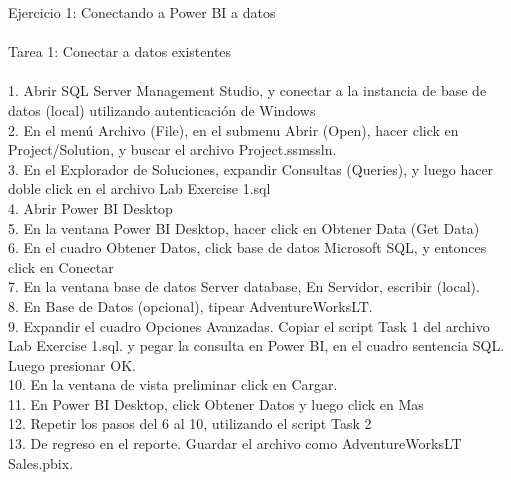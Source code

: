 \begin{itemize}
    Ejercicio 1: Conectando a Power BI a datos \\\\
    Tarea 1: Conectar a datos existentes\\\\
    1.  Abrir SQL Server Management Studio, y conectar a la instancia de base de datos (local) utilizando
        autenticación de Windows\\
    2.  En el menú Archivo (File), en el submenu Abrir (Open), hacer click en Project/Solution, y buscar el       archivo Project.ssmssln.\\
    3.  En el Explorador de Soluciones, expandir Consultas (Queries), y luego hacer doble click en el archivo     Lab Exercise 1.sql\\
    4.  Abrir Power BI Desktop\\
    5.  En la ventana Power BI Desktop, hacer click en Obtener Data (Get Data)\\
    6.  En el cuadro Obtener Datos, click base de datos Microsoft SQL, y entonces click en Conectar\\
    7.  En la ventana base de datos Server database, En Servidor, escribir (local).\\
    8.  En Base de Datos (opcional), tipear AdventureWorksLT.\\
    9.  Expandir el cuadro Opciones Avanzadas. Copiar el script Task 1 del archivo Lab Exercise 1.sql. y       pegar la consulta en Power BI, en el cuadro sentencia SQL. Luego presionar OK.\\
    10.  En la ventana de vista preliminar click en Cargar.\\
    11.  En Power BI Desktop, click Obtener Datos y luego click en Mas\\
    12.  Repetir los pasos del 6 al 10, utilizando el script Task 2\\
    13.  De regreso en el reporte. Guardar el archivo como AdventureWorksLT Sales.pbix.\\

\end{itemize} 


